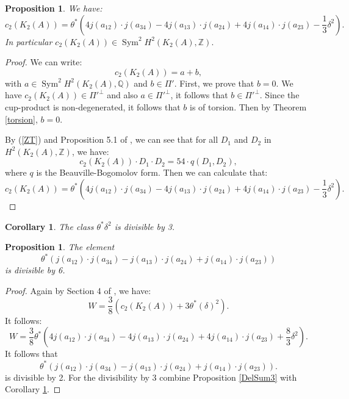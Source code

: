 \documentclass{amsart}
\DeclareMathOperator{\Sym}{Sym}
\newcommand{\Q}{\mathbb{Q}}
\newcommand{\Z}{\mathbb{Z}}
\theoremstyle{plain}
\newtheorem{proposition}[theorem]{Proposition}
\newtheorem{corollary}[theorem]{Corollary}
\theoremstyle{definition}
\theoremstyle{remark}
\begin{document}
\begin{proposition}
We have:
$$c_{2}(K_{2}(A))=\theta^{*}\left(4j(a_{12})\cdot j(a_{34})-4j(a_{13})\cdot j(a_{24})+4j(a_{14})\cdot j(a_{23})-\frac{1}{3}\delta^{2}\right).$$
In particular $c_{2}(K_{2}(A))\in \Sym^2 H^{2}(K_{2}(A),\Z).$
\end{proposition}
\begin{proof}
We can write:
$$c_{2}(K_{2}(A))=a+b,$$
with $a\in \Sym^2 H^{2}(K_{2}(A),\Q)$ and $b\in \Pi'$.
First, we prove that $b=0$.
We have $c_{2}(K_{2}(A))\in \Pi'^{\bot}$ and also $a\in \Pi'^{\bot}$, it follows that 
$b\in \Pi'^{\bot}$. 
Since the cup-product is non-degenerated, it follows that $b$ is of torsion. 
Then by Theorem \ref{torsion}, $b=0$.

By (\ref{ZT}) and Proposition 5.1 of \cite{HassettTschinkel}, we can see that for all $D_{1}$ and $D_{2}$ in $H^{2}(K_{2}(A),\Z)$, we have:
$$c_{2}(K_{2}(A))\cdot D_{1}\cdot D_{2}=54\cdot q(D_{1},D_{2}),$$
where $q$ is the Beauville-Bogomolov form.
Then we can calculate that:
$$c_{2}(K_{2}(A))=\theta^{*}\left(4j(a_{12})\cdot j(a_{34})-4j(a_{13})\cdot j(a_{24})+4j(a_{14})\cdot j(a_{23})-\frac{1}{3}\delta^{2}\right).$$
\end{proof}
\begin{corollary}\label{DeltaSquare3}
The class $\theta^* \delta^2$ is divisible by 3.
\end{corollary}

\begin{proposition}
The element 
$$\theta^{*}\left(j(a_{12})\cdot j(a_{34})-j(a_{13})\cdot j(a_{24})+j(a_{14})\cdot j(a_{23})\right)$$ 
is divisible by 6.
\end{proposition}
\begin{proof}
Again by Section 4 of \cite{HassettTschinkel}, we have:
$$W=\frac{3}{8}(c_{2}(K_{2}(A))+3\theta^{*}(\delta)^2).$$
It follows:
\begin{equation}
W=\frac{3}{8}\theta^{*}\left(4j(a_{12})\cdot j(a_{34})-4j(a_{13})\cdot j(a_{24})+4j(a_{14})\cdot j(a_{23})+\frac{8}{3}\delta^{2}\right).
\label{W}
\end{equation}
It follows that 
$$\theta^{*}(j(a_{12})\cdot j(a_{34})-j(a_{13})\cdot j(a_{24})+j(a_{14})\cdot j(a_{23})).$$
is divisible by 2.
For the divisibility by 3 combine Proposition \ref{DelSum3} with Corollary \ref{DeltaSquare3}.
\end{proof}
\end{document}
